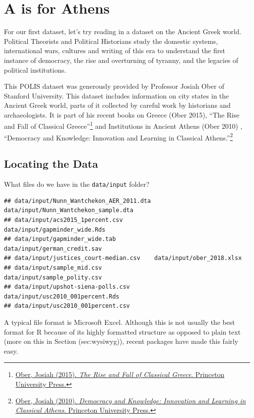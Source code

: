 \documentclass[
]{book}
\theoremstyle{definition}
\theoremstyle{definition}
\theoremstyle{definition}
\theoremstyle{remark}
\begin{document}
\hypertarget{a-is-for-athens}{%
\section{A is for Athens}\label{a-is-for-athens}}

For our first dataset, let's try reading in a dataset on the Ancient Greek world. Political Theorists and Political Historians study the domestic systems, international wars, cultures and writing of this era to understand the first instance of democracy, the rise and overturning of tyranny, and the legacies of political institutions.

This POLIS dataset was generously provided by Professor Josiah Ober of Stanford University. This dataset includes information on city states in the Ancient Greek world, parts of it collected by careful work by historians and archaeologists. It is part of his recent books on Greece (Ober 2015), ``The Rise and Fall of Classical Greece''\footnote{\href{https://press.princeton.edu/titles/10423.html}{Ober, Josiah (2015). \emph{The Rise and Fall of Classical Greece}. Princeton University Press.}} and Institutions in Ancient Athens (Ober 2010) , ``Democracy and Knowledge: Innovation and Learning in Classical Athens.''\footnote{\href{https://press.princeton.edu/titles/8742.html}{Ober, Josiah (2010). \emph{Democracy and Knowledge: Innovation and Learning in Classical Athens}. Princeton University Press.}}

\hypertarget{locating-the-data}{%
\subsection{Locating the Data}\label{locating-the-data}}

What files do we have in the \texttt{data/input} folder?

\begin{verbatim}
## data/input/Nunn_Wantchekon_AER_2011.dta data/input/Nunn_Wantchekon_sample.dta   
## data/input/acs2015_1percent.csv         data/input/gapminder_wide.Rds           
## data/input/gapminder_wide.tab           data/input/german_credit.sav            
## data/input/justices_court-median.csv    data/input/ober_2018.xlsx               
## data/input/sample_mid.csv               data/input/sample_polity.csv            
## data/input/upshot-siena-polls.csv       data/input/usc2010_001percent.Rds       
## data/input/usc2010_001percent.csv
\end{verbatim}

A typical file format is Microsoft Excel. Although this is not usually the best format for R because of its highly formatted structure as opposed to plain text (more on this in Section (sec:wysiwyg)), recent packages have made this fairly easy.
\end{document}
